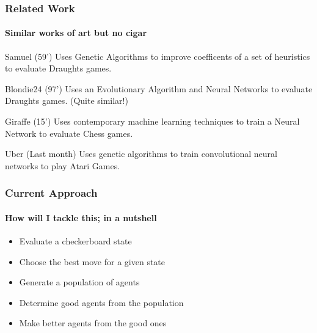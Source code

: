 \documentclass[aspectratio=169]{beamer}
\begin{document}
\begin{frame}
	\frametitle{Related Work}
	\framesubtitle{Similar works of art but no cigar}
	\begin{block}{Samuel (59')}
		Uses Genetic Algorithms to improve coefficents of a set of heuristics to evaluate Draughts games. \cite{samuel_studies_2000}
	\end{block}
	\begin{block}{Blondie24 (97')}
		Uses an Evolutionary Algorithm and Neural Networks to evaluate Draughts games. (Quite similar!) \cite{chellapilla_evolving_1999}
	\end{block}

	 \begin{block}{Giraffe (15')}
		Uses contemporary machine learning techniques to train a Neural Network to evaluate Chess games. \cite{lai_giraffe:_2015}
	 \end{block}

	 \begin{block}{Uber (Last month)}
		Uses genetic algorithms to train convolutional neural networks to play Atari Games. \cite{such_deep_2017}
	 \end{block}
\end{frame}

\begin{frame}
	\frametitle{Current Approach}
	\framesubtitle{How will I tackle this; in a nutshell}
	\begin{itemize}
		\item Evaluate a checkerboard state
		\item Choose the best move for a given state
		\item Generate a population of agents
		\item Determine good agents from the population
		\item Make better agents from the good ones
	\end{itemize}

\end{frame}
\end{document}
